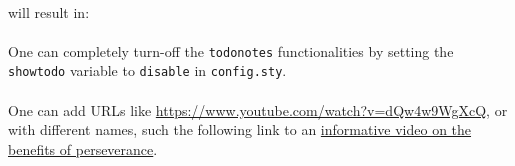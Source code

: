 \paragraph{}will result in:


\paragraph{}One can completely turn-off the \texttt{todonotes} functionalities by setting the \texttt{showtodo} variable to \texttt{disable} in \texttt{config.sty}.

\paragraph{}One can add URLs like \url{https://www.youtube.com/watch?v=dQw4w9WgXcQ}, or with different names, such the following link to an \href{https://www.youtube.com/watch?v=dQw4w9WgXcQ}{informative video on the benefits of perseverance}.
